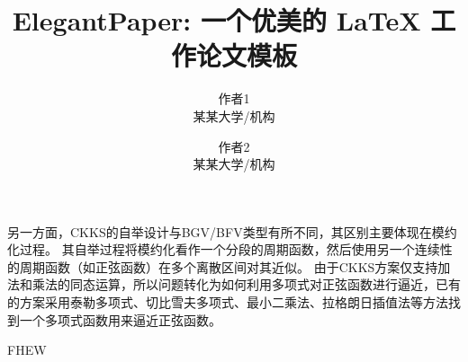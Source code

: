 \documentclass[lang=cn,a4paper,newtx,bibtex]{elegantpaper}
\title{ElegantPaper: 一个优美的 \LaTeX{} 工作论文模板}
\author{作者1 \\ 某某大学/机构 \and 作者2 \\ 某某大学/机构}
\institute{\href{https://elegantlatex.org/}{Elegant\LaTeX{} 项目组}}
\date{\zhdate{2022/12/31}}
\begin{document}
\maketitle

\begin{abstract}
\end{abstract}




另一方面，CKKS的自举设计与BGV/BFV类型有所不同，其区别主要体现在模约化过程。
其自举过程将模约化看作一个分段的周期函数，然后使用另一个连续性的周期函数（如正弦函数）在多个离散区间对其近似。
由于CKKS方案仅支持加法和乘法的同态运算，所以问题转化为如何利用多项式对正弦函数进行逼近，已有的方案采用泰勒多项式\cite{HE351/CHKKS18}、切比雪夫多项式\cite{HE353}\cite{HE359/eurocrypt/LeeLLKN21}、最小二乘法\cite{HE364}、拉格朗日插值法\cite{HE363}等方法找到一个多项式函数用来逼近正弦函数。


FHEW\cite{HE410FHEW/DucasM21}
\printbibliography[heading=bibintoc, title=\ebibname]

\appendix
\addappheadtotoc
\end{document}
